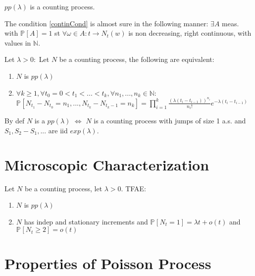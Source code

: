 \begin{ex}[]
	$pp(\lambda )$ is a counting process.
\end{ex}

\begin{rmk}[]
	The condition \ref{continCond} is almost sure in the following manner: $\exists A$ meas. with $\mathbb{P}_{} \left[ A \right] =1$ st $\forall \omega \in A: t \to N_t(w)$ is non decreasing, right continuous, with values in $\mathbb{N}$.
\end{rmk}

\begin{theorem}[]
	Let $\lambda> 0:$ Let $N$ be a counting process, the following are equivalent:
\begin{enumerate}
	\item $N$ is $pp(\lambda)$
	\item $\forall k \geq 1, \forall t_0 =0 < t_1 <...<t_k, \forall n_1,...,n_k \in \mathbb{N}:$ \\ $\mathbb{P}_{} \left[ N_{t_1}-N_{t_0}=n_1,...,N_{t_k}-N_{t_k-1}=n_k \right] = \prod_{i=1}^k \frac{(\lambda (t_i - t_{i-1}))^{n_i}}{n_i!} e^{-\lambda (t_i - t_{i-1})} $
\end{enumerate}

\end{theorem}

\begin{rmk}[]
	By def $N$ is a $pp(\lambda)$ $\iff $ $N$ is a counting process with jumps of size 1 a.s. and  $S_1,S_2-S_1,...$ are iid  $exp(\lambda)$.
\end{rmk}

\section{Microscopic Characterization}
\begin{theorem}[]
	Let $N$ be a counting process, let $\lambda> 0$. TFAE:
\begin{enumerate}
	\item $N$ is $pp(\lambda)$ 
	\item $N$ has indep and stationary increments and $\mathbb{P}_{} \left[ N_t =1 \right] = \lambda t + o(t)$ and $\mathbb{P}_{} \left[ N_t \geq 2 \right] = o(t)$
\end{enumerate}

\end{theorem}

\section{Properties of Poisson Process}

